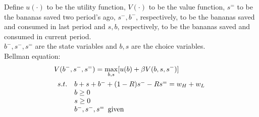 \documentclass{article}
\begin{document}
\begin{enumerate}
\begin{enumerate}
            Define $u(\cdot)$ to be the utility function, $V(\cdot)$ to be the value function, $s^=$ to be the bananas saved two period's ago, $s^-,b^-$, respectively, to be the bananas saved and consumed in last period and $s,b$, respectively, to be the bananas saved and consumed in current period.\\
            $b^-,s^-,s^=$ are the state variables and $b,s$ are the choice variables.\\
            Bellman equation: 
            \begin{align*}
                &V(b^-,s^-,s^=)=\max_{b,s}[u(b)+\beta V(b,s,s^-)]\\
                &\begin{array}{r@{\quad}l}
                    s.t.&b+s+b^-+(1-R)s^--Rs^==w_H+w_L\\
                    &b\ge0\\
                    &s\ge0\\
                    &b^-,s^-,s^=\enspace\text{given}  
                \end{array}           
            \end{align*}
        \end{enumerate}
    \end{enumerate}
\end{document}
